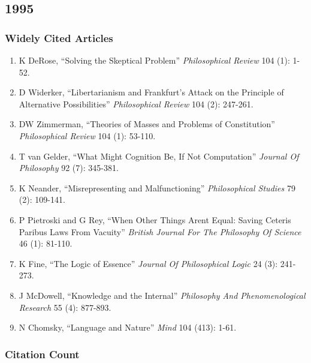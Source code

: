 \documentclass[
  10pt,
  letterpaper,
  DIV=11,
  numbers=noendperiod,
  twoside]{scrartcl}
\providecommand{\tightlist}{%
  \setlength{\itemsep}{0pt}\setlength{\parskip}{0pt}}\usepackage{longtable,booktabs,array}
\begin{document}
\newpage

\subsection{1995}\label{section-19}

\subsubsection*{Widely Cited Articles}\label{widely-cited-articles-19}

\begin{enumerate}
\def\labelenumi{\arabic{enumi}.}
\tightlist
\item
  K DeRose, ``Solving the Skeptical Problem'' \emph{Philosophical
  Review} 104 (1): 1-52.
\item
  D Widerker, ``Libertarianism and Frankfurt's Attack on the Principle
  of Alternative Possibilities'' \emph{Philosophical Review} 104 (2):
  247-261.
\item
  DW Zimmerman, ``Theories of Masses and Problems of Constitution''
  \emph{Philosophical Review} 104 (1): 53-110.
\item
  T van Gelder, ``What Might Cognition Be, If Not Computation''
  \emph{Journal Of Philosophy} 92 (7): 345-381.
\item
  K Neander, ``Misrepresenting and Malfunctioning'' \emph{Philosophical
  Studies} 79 (2): 109-141.
\item
  P Pietroski and G Rey, ``When Other Things Arent Equal: Saving Ceteris
  Paribus Laws From Vacuity'' \emph{British Journal For The Philosophy
  Of Science} 46 (1): 81-110.
\item
  K Fine, ``The Logic of Essence'' \emph{Journal Of Philosophical Logic}
  24 (3): 241-273.
\item
  J McDowell, ``Knowledge and the Internal'' \emph{Philosophy And
  Phenomenological Research} 55 (4): 877-893.
\item
  N Chomsky, ``Language and Nature'' \emph{Mind} 104 (413): 1-61.
\end{enumerate}

\subsubsection*{Citation Count}\label{citation-count-19}
\end{document}
